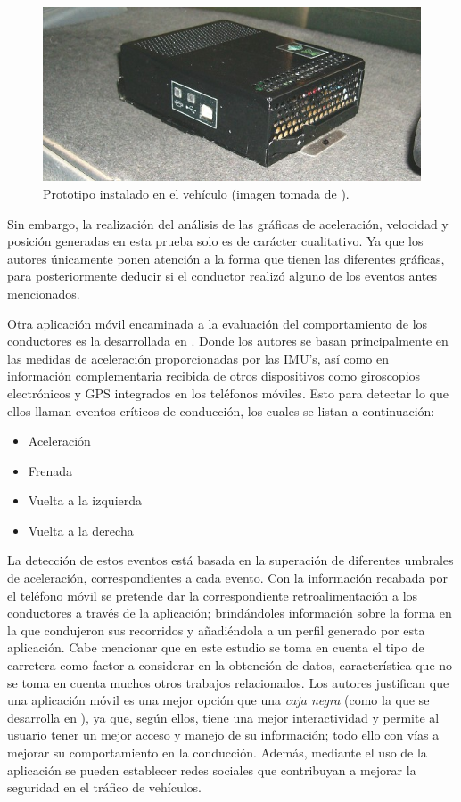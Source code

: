 \begin{figure}[H]
\centering
\includegraphics[scale=0.7]{8.png}
\caption{Prototipo instalado en el vehículo (imagen tomada de \cite{Quito2}).}
\label{8}
\end{figure}

Sin embargo, la realización del análisis de las gráficas de aceleración, velocidad y posición generadas en esta prueba solo es de carácter cualitativo.
Ya que los autores únicamente ponen atención a la forma que tienen las diferentes gráficas, para posteriormente deducir si el conductor realizó alguno de los eventos antes mencionados. 

Otra aplicación móvil encaminada a la evaluación del comportamiento de los conductores es la desarrollada en \cite{Paefgen:2012:DBA:2406367.2406412}. 
Donde los autores se basan principalmente en las medidas de aceleración proporcionadas por las IMU’s, así como en información complementaria recibida de otros dispositivos como giroscopios electrónicos y GPS integrados en los teléfonos móviles. 
Esto para detectar lo que ellos llaman eventos críticos de conducción, los cuales se listan a continuación:

\begin{itemize}
\item Aceleración
\item Frenada
\item Vuelta a la izquierda
\item Vuelta a la derecha
\end{itemize}

La detección de estos eventos está basada en la superación de diferentes umbrales de aceleración, correspondientes a cada evento. 
Con la información recabada por el teléfono móvil se pretende dar la correspondiente retroalimentación a los conductores a través de la aplicación; brindándoles información sobre la forma en la que condujeron sus recorridos y añadiéndola a un perfil generado por esta aplicación. 
Cabe mencionar que en este estudio se toma en cuenta el tipo de carretera como factor a considerar en la obtención de datos, característica que no se toma en cuenta muchos otros trabajos relacionados.
Los autores justifican que una aplicación móvil es una mejor opción que una {\em caja negra} (como la que se desarrolla en \cite{Quito2}), ya que, según ellos, tiene una mejor interactividad y permite al usuario tener un mejor acceso y manejo de su información; todo ello con vías a mejorar su comportamiento en la conducción.
Además, mediante el uso de la aplicación se pueden establecer redes sociales que contribuyan a mejorar la seguridad en el tráfico de vehículos.

